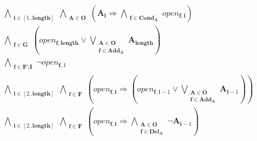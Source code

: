 \documentclass[fleqn]{article}
\begin{document}
\begin{multline*}
\bigwedge\limits_{\substack{\mathbf{i}\in [1..\mathbf{length}]}}\bigwedge\limits_{\substack{\mathbf{A}\in \mathbf{O}}}\left(\mathbf{A}_{\mathbf{i}} \Rightarrow \bigwedge\limits_{\substack{\mathbf{f}\in \mathbf{Cond}_{\mathbf{A}}}}open_{\mathbf{f},\mathbf{i}}\right)\\
\bigwedge\limits_{\substack{\mathbf{f}\in \mathbf{G}}}\left(open_{\mathbf{f},\mathbf{length}} \vee \bigvee\limits_{\substack{\mathbf{A}\in \mathbf{O}\\\mathbf{f} \in \mathbf{Add}_{\mathbf{A}}}}\mathbf{A}_{\mathbf{length}}\right)\\
\bigwedge\limits_{\substack{\mathbf{f}\in \mathbf{F}\setminus \mathbf{I}}}\neg open_{\mathbf{f},1}\\
\bigwedge\limits_{\substack{\mathbf{i}\in [2..\mathbf{length}]}}\bigwedge\limits_{\substack{\mathbf{f}\in \mathbf{F}}}\left(open_{\mathbf{f},\mathbf{i}} \Rightarrow \left(open_{\mathbf{f},\mathbf{i} - 1} \vee \bigvee\limits_{\substack{\mathbf{A}\in \mathbf{O}\\\mathbf{f} \in \mathbf{Add}_{\mathbf{A}}}}\mathbf{A}_{\mathbf{i} - 1}\right)\right)\\
\bigwedge\limits_{\substack{\mathbf{i}\in [2..\mathbf{length}]}}\bigwedge\limits_{\substack{\mathbf{f}\in \mathbf{F}}}\left(open_{\mathbf{f},\mathbf{i}} \Rightarrow \bigwedge\limits_{\substack{\mathbf{A}\in \mathbf{O}\\\mathbf{f} \in \mathbf{Del}_{\mathbf{A}}}}\neg \mathbf{A}_{\mathbf{i} - 1}\right)\\

\end{multline*}
\end{document}
